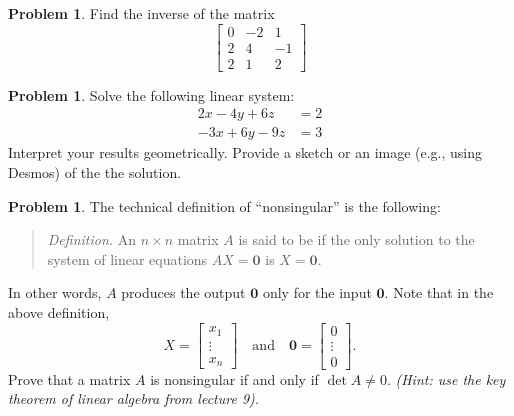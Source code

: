 \documentclass[10pt]{article}
\theoremstyle{definition}
\newtheorem{problem}[theorem]{Problem}
\newcommand{\1}[1]{\textbf{1}_{\left[#1\right]}} %
\newcommand{\dempfcolor}[1]{{\color{RoyalBlue}#1}}
\newcommand{\demph}[1]{\dempfcolor{{\sl #1}}}
\begin{document}
\begin{problem}
  Find the inverse of the matrix
  \begin{equation*}
    \begin{bmatrix}
      0&-2&1\\
      2&4&-1\\
      2&1&2
    \end{bmatrix}
  \end{equation*}
\end{problem}


\begin{problem}
  Solve the following linear system:
  \begin{align*}
    2x-4y+6z&=2\\
    -3x+6y-9z&=3
  \end{align*}
  Interpret your results geometrically. Provide a sketch or an image (e.g.,
  using Desmos) of the the solution.
\end{problem}

\begin{problem}
  The technical definition of ``nonsingular'' is the following:
  \begin{quote}
    \textit{Definition.} An $n\times n$ matrix $A$ is said to
    be \demph{\textbf{nonsingular}} if the only solution to the system of linear
    equations $AX=\mathbf{0}$ is $X=\mathbf{0}$.
  \end{quote}
  In other words, $A$ produces the output $\mathbf{0}$ only for the input
  $\mathbf{0}$. Note that in the above definition,
  \begin{equation*}
    X=
    \begin{bmatrix}
      x_{1}\\
      \vdots\\
      x_{n}
    \end{bmatrix}
    \quad \text{and} \quad 
    \mathbf{0}=
    \begin{bmatrix}
      0\\
      \vdots\\
      0
    \end{bmatrix}.
  \end{equation*}
  Prove that a matrix $A$ is nonsingular if and only if $\det A\neq 0$.
  \textit{(Hint: use the key theorem of linear algebra from lecture 9).}
\end{problem}
\end{document}

